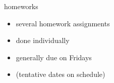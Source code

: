 

\begin{frame}{homeworks}
    \begin{itemize}
    \item several homework assignments
    \item done individually
    \item generally due on Fridays
    \item (tentative dates on schedule)
    \end{itemize}
\end{frame}
